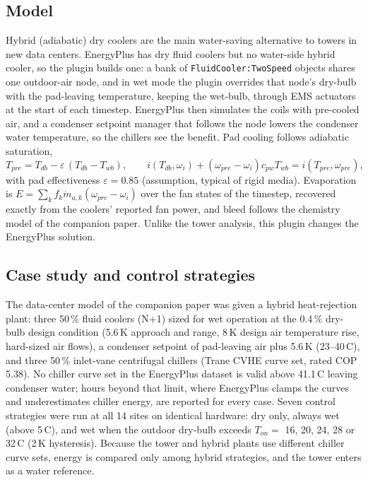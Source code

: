 \documentclass[preprint,12pt,authoryear]{elsarticle}
\begin{document}
\subsection{Model}
Hybrid (adiabatic) dry coolers are the main water-saving alternative to towers in new data centers. EnergyPlus has
dry fluid coolers but no water-side hybrid cooler, so the plugin builds one: a bank of \texttt{FluidCooler:TwoSpeed}
objects shares one outdoor-air node, and in wet mode the plugin overrides that node's dry-bulb with the pad-leaving
temperature, keeping the wet-bulb, through EMS actuators at the start of each timestep. EnergyPlus then simulates the
coils with pre-cooled air, and a condenser setpoint manager that follows the node lowers the condenser water
temperature, so the chillers see the benefit. Pad cooling follows adiabatic saturation,
\begin{equation}
T_{pre} = T_{db} - \varepsilon\,(T_{db}-T_{wb}),\qquad i(T_{db},\omega_i) + (\omega_{pre}-\omega_i)c_{pw}T_{wb} = i(T_{pre},\omega_{pre}),
\end{equation}
with pad effectiveness $\varepsilon=0.85$ (assumption, typical of rigid media). Evaporation is
$E=\sum_k f_k\dot m_{a,k}(\omega_{pre}-\omega_i)$ over the fan states of the timestep, recovered exactly from the
coolers' reported fan power, and bleed follows the chemistry model of the companion paper. Unlike the tower
analysis, this plugin changes the EnergyPlus solution.

\subsection{Case study and control strategies}
The data-center model of the companion paper was given a hybrid heat-rejection plant: three 50\,\% fluid coolers
(N+1) sized for wet operation at the 0.4\,\% dry-bulb design condition (5.6\,K approach and range, 8\,K design air
temperature rise, hard-sized air flows), a condenser setpoint of pad-leaving air plus 5.6\,K (23--40\,\textdegree C), and
three 50\,\% inlet-vane centrifugal chillers (Trane CVHE curve set, rated COP 5.38). No chiller curve set in the
EnergyPlus dataset is valid above 41.1\,\textdegree C leaving condenser water; hours beyond that limit, where EnergyPlus
clamps the curves and underestimates chiller energy, are reported for every case. Seven control strategies were run
at all 14 sites on identical hardware: dry only, always wet (above 5\,\textdegree C), and wet when the outdoor
dry-bulb exceeds $T_{on}=$ 16, 20, 24, 28 or 32\,\textdegree C (2\,K hysteresis). Because the tower and hybrid plants use
different chiller curve sets, energy is compared only among hybrid strategies, and the tower enters as a water
reference.
\end{document}
